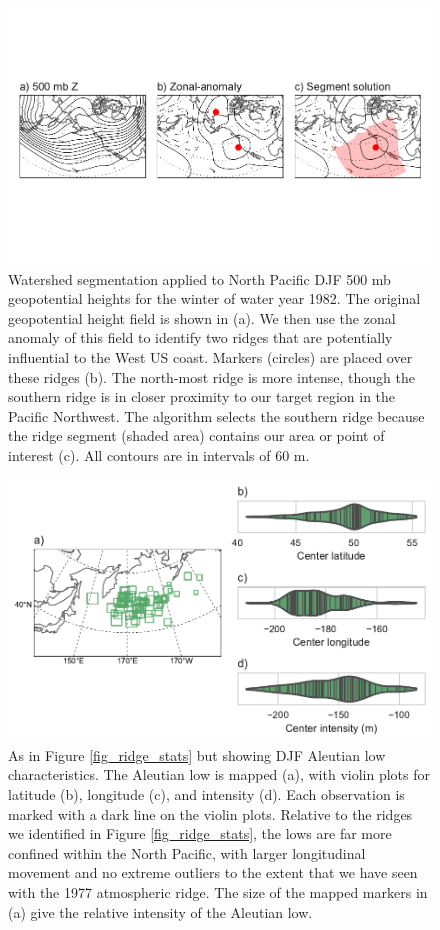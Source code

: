 \documentclass[final, double]{ua-thesis}
\begin{document}
\begin{figure}[ht]
 \centerline{\includegraphics[width=39pc]{p2figures/fig_watershed_explanation.pdf}}
  \caption{Watershed segmentation applied to North Pacific DJF 500 mb geopotential heights for the winter of water year 1982. The original geopotential height field is shown in (a). We then use the zonal anomaly of this field to identify two ridges that are potentially influential to the West US coast. Markers (circles) are placed over these ridges (b). The north-most ridge is more intense, though the southern ridge is in closer proximity to our target region in the Pacific Northwest. The algorithm selects the southern ridge because the ridge segment (shaded area) contains our area or point of interest (c).  All contours are in intervals of 60 m.}\label{fig_watershed_explaination}
\end{figure}

\begin{figure}[ht]
 \centerline{\includegraphics[width=39pc]{p2figures/fig_aleutian_stats.pdf}}
  \caption{As in Figure \ref{fig_ridge_stats} but showing DJF Aleutian low characteristics. The Aleutian low is mapped (a), with violin plots for latitude (b), longitude (c), and intensity (d). Each observation is marked with a dark line on the violin plots. Relative to the ridges we identified in Figure \ref{fig_ridge_stats}, the lows are far more confined within the North Pacific, with larger longitudinal movement and no extreme outliers to the extent that we have seen with the 1977 atmospheric ridge. The size of the mapped markers in (a) give the relative intensity of the Aleutian low.}\label{fig_aleutian_stats}
\end{figure}
\end{document}
